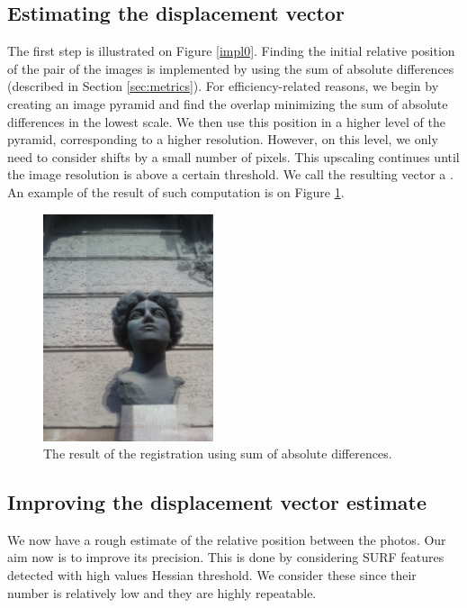 \subsection{Estimating the displacement vector}
The first step is illustrated on Figure \ref{impl0}.
Finding the initial relative position of the pair of the images is implemented by using the sum of absolute differences (described in Section \ref{sec:metrics}).
For efficiency-related reasons, we begin by creating an image pyramid and find the overlap minimizing the sum of absolute differences in the lowest scale. 
We then use this position in a higher level of the pyramid, corresponding to a higher resolution. 
However, on this level, we only need to consider shifts by a small number of pixels. 
This upscaling continues until the image resolution is above a certain threshold. 
We call the resulting vector a .
An example of the result of such computation is on Figure \ref{emaover}.

\begin{figure}[H]
\centering
\includegraphics[width=5cm]{img/ema_overlap.png}
\caption{The result of the registration using sum of absolute differences.}
\label{emaover}
\end{figure} 

\subsection{Improving the displacement vector estimate}
\label{sec:improving}

We now have a rough estimate of the relative position between the photos. 
Our aim now is to improve its precision.
This is done by considering SURF features detected with high values Hessian threshold. 
We consider these since their number is relatively low and they are highly repeatable. 

